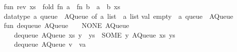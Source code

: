\begin{isabellebody}
\begin{isamarkuptext}
fun\ rev\ xs\ {}\ fold\ {}fn\ a\ {}{}\ fn\ b\ {}{}\ a\ {}{}\ b{}\ xs\ {}{}{}\isanewline
\isanewline
datatype\ {}a\ queue\ {}\ AQueue\ of\ {}a\ list\ {}\ {}a\ list{}\isanewline
\isanewline
val\ empty\ {}\ {}a\ queue\ {}\ AQueue\ {}{}{}{}\ {}{}{}{}\isanewline
\isanewline
fun\ dequeue\ {}AQueue\ {}{}{}{}\ {}{}{}{}\ {}\ {}NONE{}\ AQueue\ {}{}{}{}\ {}{}{}{}\isanewline
\ \ {}\ dequeue\ {}AQueue\ {}xs{}\ y\ {}{}\ ys{}{}\ {}\ {}SOME\ y{}\ AQueue\ {}xs{}\ ys{}{}\isanewline
\ \ {}\ dequeue\ {}AQueue\ {}v\ {}{}\ va{}\ {}{}{}{}\ {}\isanewline

\end{isamarkuptext}
\end{isabellebody}

